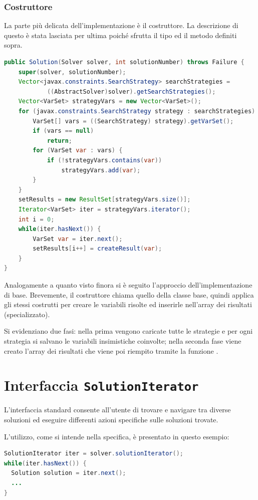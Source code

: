 \subsubsection{Costruttore}
La parte più delicata dell'implementazione è il costruttore. 
La descrizione di questo è stata
lasciata per ultima poiché sfrutta il tipo ed il metodo definiti sopra.
\begin{lstlisting}[language = Java,
                 caption = {\files{createResult} per variabili insiemistiche.}]
public Solution(Solver solver, int solutionNumber) throws Failure {
	super(solver, solutionNumber);
	Vector<javax.constraints.SearchStrategy> searchStrategies = 
            ((AbstractSolver)solver).getSearchStrategies();
	Vector<VarSet> strategyVars = new Vector<VarSet>();
	for (javax.constraints.SearchStrategy strategy : searchStrategies) {
		VarSet[] vars = ((SearchStrategy) strategy).getVarSet();
		if (vars == null)
			return;
		for (VarSet var : vars) {
			if (!strategyVars.contains(var))
				strategyVars.add(var);
		}
	}
	setResults = new ResultSet[strategyVars.size()];
	Iterator<VarSet> iter = strategyVars.iterator();
	int i = 0;
	while(iter.hasNext()) {
		VarSet var = iter.next();
		setResults[i++] = createResult(var);
	}	
}
\end{lstlisting}
Analogamente a quanto visto finora si è seguito l'approccio dell'implementazione
di base. Brevemente, il costruttore chiama quello della classe base, quindi
applica gli stessi costrutti per creare le variabili risolte ed inserirle 
nell'array dei risultati (specializzato).

Si evidenziano due fasi: nella prima vengono caricate tutte le strategie e 
per ogni strategia si salvano le variabili insimistiche coinvolte; nella
seconda fase viene creato l'array dei risultati che viene poi riempito
tramite la funzione .


\section{Interfaccia \texttt{SolutionIterator}}
L'interfaccia standard  consente all'utente di trovare
e navigare tra diverse soluzioni ed eseguire differenti azioni specifiche
sulle soluzioni trovate.

L'utilizzo, come si intende nella specifica, è presentato in questo esempio:
\begin{lstlisting}[language = Java,frame = single]
SolutionIterator iter = solver.solutionIterator();
while(iter.hasNext()) {
  Solution solution = iter.next();
  ...
}
\end{lstlisting}

